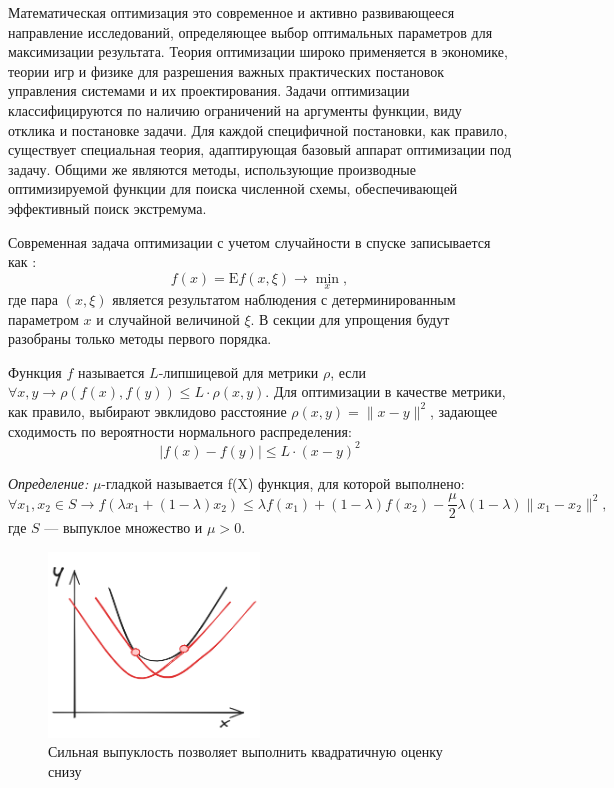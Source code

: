 Математическая оптимизация это современное и активно развивающееся направление исследований, определяющее
выбор оптимальных параметров для максимизации результата. Теория оптимизации широко применяется в экономике,
теории игр и физике для разрешения важных практических постановок управления системами и их проектирования. 
Задачи оптимизации классифицируются по наличию ограничений на аргументы функции, виду отклика и постановке задачи. 
Для каждой специфичной постановки, как правило, существует специальная теория, адаптирующая базовый аппарат 
оптимизации под задачу. Общими же являются методы, использующие производные оптимизируемой функции для поиска 
численной схемы, обеспечивающей эффективный поиск экстремума.

Современная задача оптимизации с учетом случайности в спуске записывается как \cite{nesterov2015universal}:
\begin{equation}
    f(x) = \mathrm{E} f(x,\xi) \rightarrow \min_x,
\end{equation}
где пара $(x,\xi)$ является результатом наблюдения с детерминированным параметром $x$ и случайной величиной $\xi$.
В секции для упрощения будут разобраны только методы первого порядка.

 Функция $f$ называется $L$-липшицевой для метрики $\rho$, 
если $\forall x,y \rightarrow \rho(f(x),f(y)) \le L \cdot \rho(x,y)$.
Для оптимизации в качестве метрики, как правило, выбирают эвклидово расстояние $\rho(x,y) =\|x-y \|^2$, задающее 
сходимость по вероятности нормального распределения:   
\begin{equation}
    |f(x) - f(y)| \le L \cdot (x-y)^2
\end{equation}

\textit{Определение:} $\mu$-гладкой называется f(X) функция, для которой выполнено:
\begin{equation}
   \forall x_1,x_2 \in S \rightarrow f(\lambda x_1 + (1-\lambda)x_2) \le \lambda f(x_1) + (1-\lambda) f(x_2) - \frac{\mu}{2} \lambda (1-\lambda) \| x_1 - x_2 \|^2,
\end{equation}
где $S$ --- выпуклое множество и $\mu > 0$. 

\begin{figure}[h]
    \centering
    \includegraphics[width=0.5\textwidth]{assets/math/optimization/strong_convex.excalidraw.png}
    \caption{Сильная выпуклость позволяет выполнить квадратичную оценку снизу}
    \label{strong_convex}
\end{figure}

